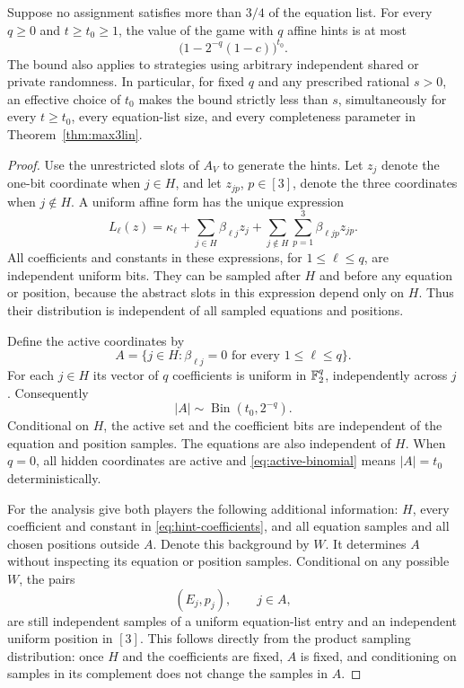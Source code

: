 \begin{lemma}\label{lem:hint-soundness}
Suppose no assignment satisfies more than $3/4$ of the equation list. For
every $q\ge0$ and $t\ge t_0\ge1$, the value of the game with $q$ affine
hints is at most
\begin{equation}\label{eq:hint-bound}
 \bigl(1-2^{-q}(1-c)\bigr)^{t_0}.
\end{equation}
The bound also applies to strategies using arbitrary independent shared
or private randomness. In particular, for fixed $q$ and any prescribed
rational $s>0$, an effective choice of $t_0$ makes the bound strictly less
than $s$, simultaneously for every $t\ge t_0$, every equation-list size,
and every completeness parameter in Theorem~\ref{thm:max3lin}.
\end{lemma}
\begin{proof}
Use the unrestricted slots of $A_V$ to generate the hints. Let $z_j$ denote
the one-bit coordinate when $j\in H$, and let $z_{jp}$, $p\in[3]$, denote
the three coordinates when $j\notin H$. A uniform affine form has the
unique expression
\begin{equation}\label{eq:hint-coefficients}
 L_\ell(z)=\kappa_\ell+
       \sum_{j\in H}\beta_{\ell j}z_j+
       \sum_{j\notin H}\sum_{p=1}^3\beta_{\ell jp}z_{jp}.
\end{equation}
All coefficients and constants in these expressions, for $1\le\ell\le q$,
are independent uniform bits. They can be sampled after $H$ and before
any equation or position, because the abstract slots in this expression
depend only on $H$. Thus their distribution is independent of all sampled
equations and positions.

Define the active coordinates by
\[
 A=\{j\in H:\beta_{\ell j}=0\text{ for every }1\le\ell\le q\}.
\]
For each $j\in H$ its vector of $q$ coefficients is uniform in $\mathbb F_2^q$,
independently across $j$. Consequently
\begin{equation}\label{eq:active-binomial}
 |A|\sim\operatorname{Bin}(t_0,2^{-q}).
\end{equation}
Conditional on $H$, the active set and the coefficient bits are independent
of the equation and position samples. The equations are also independent
of $H$. When $q=0$, all hidden coordinates are active and
\eqref{eq:active-binomial} means $|A|=t_0$ deterministically.

For the analysis give both players the following additional information:
$H$, every coefficient and constant in \eqref{eq:hint-coefficients}, and
all equation samples and all chosen positions outside $A$. Denote this
background by $W$. It determines $A$ without inspecting its equation or
position samples. Conditional on any possible $W$, the pairs
\[
 (E_j,p_j),\qquad j\in A,
\]
are still independent samples of a uniform equation-list entry and an
independent uniform position in $[3]$. This follows directly from the
product sampling distribution: once $H$ and the coefficients are fixed,
$A$ is fixed, and conditioning on samples in its complement does not
change the samples in $A$.


\end{proof}
